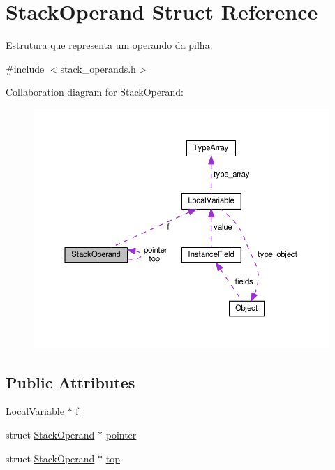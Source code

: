 \hypertarget{structStackOperand}{}\section{Stack\+Operand Struct Reference}
\label{structStackOperand}


Estrutura que representa um operando da pilha.  




{\ttfamily \#include $<$stack\+\_\+operands.\+h$>$}



Collaboration diagram for Stack\+Operand\+:
\nopagebreak
\begin{figure}[H]
\begin{center}
\leavevmode
\includegraphics[width=350pt]{structStackOperand__coll__graph}
\end{center}
\end{figure}
\subsection*{Public Attributes}
\begin{DoxyCompactItemize}
\item 
\hyperlink{structLocalVariable}{Local\+Variable} $\ast$ \hyperlink{structStackOperand_ac2430d118d01240603507706e8a8adff}{f}
\item 
struct \hyperlink{structStackOperand}{Stack\+Operand} $\ast$ \hyperlink{structStackOperand_af4ad4c3c4e49be261c61b3856bc02b9f}{pointer}
\item 
struct \hyperlink{structStackOperand}{Stack\+Operand} $\ast$ \hyperlink{structStackOperand_a11a33c73ab08f65a14fb53af2308d052}{top}
\end{DoxyCompactItemize}


